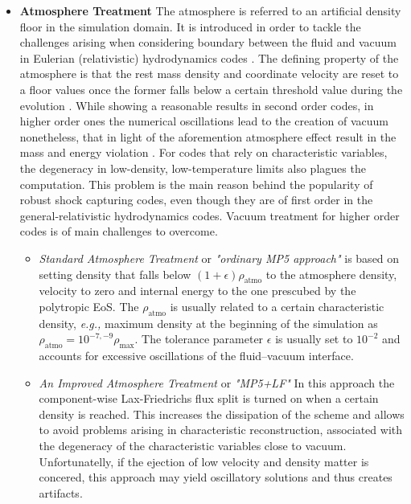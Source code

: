 \documentclass[11pt,a4paper,headinclude=true,DIV=14,BCOR=8mm,chapterprefix,listof=totoc,twoside,openright,abstracton]{scrbook}
\begin{document}
\begin{itemize}
    
    \item \textbf{Atmosphere Treatment} The atmosphere is referred to an artificial density floor in the simulation domain. It is introduced in order to tackle the challenges arising when considering boundary between the fluid and vacuum in Eulerian (relativistic) hydrodynamics codes \cite{Galeazzi:mThesis:2008,Kastaun:2006,Millmore:2009dk}. The defining property of the atmosphere is that the rest mass density and coordinate velocity are reset to a floor values once the former falls below a certain threshold value during the evolution \cite{Font:2001ew,Baiotti:2004wn}. While showing a reasonable results in second order codes, in higher order ones the numerical oscillations lead to the creation of vacuum nonetheless, that in light of the aforemention atmosphere effect result in the mass and energy violation \cite{Radice:2011qr}. For codes that rely on characteristic variables, the degeneracy in low-density, low-temperature limits also plagues the computation. This problem is the main reason behind the popularity of robust shock capturing codes, even though they are of first order in the general-relativistic hydrodynamics codes. Vacuum treatment for higher order codes is of main challenges to overcome. 
    
    \begin{itemize}
        \item \textit{Standard Atmosphere Treatment} or \textit{"ordinary MP5 approach"} is based on setting density that falls below $(1+\epsilon)\rho_{\text{atmo}}$ to the atmosphere density, velocity to zero and internal energy to the one prescubed by the polytropic EoS. The $\rho_{\text{atmo}}$ is usually related to a certain characteristic density, \textit{e.g.,} maximum density at the beginning of the simulation as $\rho_{\text{atmo}} = 10^{-7,-9}\rho_{\text{max}}$. The tolerance parameter $\epsilon$ is usually set to $10^{-2}$ and accounts for excessive oscillations of the fluid–vacuum interface. 
        
        \item \textit{An Improved Atmosphere Treatment} or \textit{"MP5+LF"} In this approach the component-wise Lax-Friedrichs flux split is turned on when a certain density is reached. This increases the dissipation of the scheme and allows to avoid problems arising in characteristic reconstruction, associated with the degeneracy of the characteristic variables close to vacuum. Unfortunatelly, if the ejection of low velocity and density matter is concered, this approach may yield oscillatory solutions and thus creates artifacts. 
        

\end{itemize}
\end{itemize}
\end{document}
